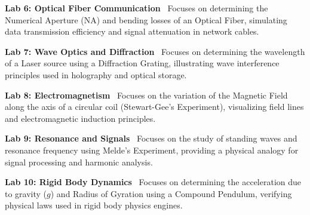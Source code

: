 \vspace{0.2cm}

\noindent\textbf{Lab 6: Optical Fiber Communication} \
Focuses on determining the Numerical Aperture (NA) and bending losses of an Optical Fiber, simulating data transmission efficiency and signal attenuation in network cables. \\

\vspace{0.2cm}

\noindent\textbf{Lab 7: Wave Optics and Diffraction} \
Focuses on determining the wavelength of a Laser source using a Diffraction Grating, illustrating wave interference principles used in holography and optical storage. \\

\vspace{0.2cm}

\noindent\textbf{Lab 8: Electromagnetism} \
Focuses on the variation of the Magnetic Field along the axis of a circular coil (Stewart-Gee’s Experiment), visualizing field lines and electromagnetic induction principles. \\

\vspace{0.2cm}

\noindent\textbf{Lab 9: Resonance and Signals} \
Focuses on the study of standing waves and resonance frequency using Melde’s Experiment, providing a physical analogy for signal processing and harmonic analysis. \\

\vspace{0.2cm}

\noindent\textbf{Lab 10: Rigid Body Dynamics} \
Focuses on determining the acceleration due to gravity ($g$) and Radius of Gyration using a Compound Pendulum, verifying physical laws used in rigid body physics engines.

\vspace{0.2cm}

\newpage
\rhead{Curriculum Schema}